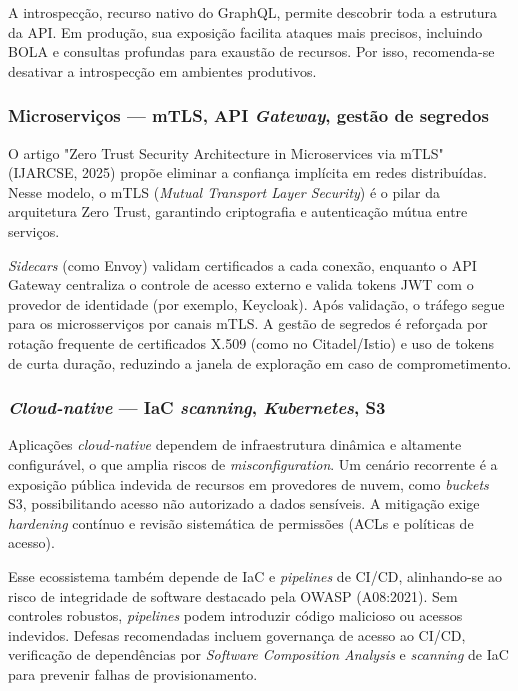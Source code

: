 A introspecção, recurso nativo do GraphQL, permite descobrir toda a estrutura da API. Em produção, sua exposição facilita ataques mais precisos, incluindo BOLA e consultas profundas para exaustão de recursos. Por isso, recomenda-se desativar a introspecção em ambientes produtivos.

\subsubsection{
    Microserviços — mTLS, API \textit{Gateway}, gestão de segredos
}\label{sec:microservicos}

O artigo "Zero Trust Security Architecture in Microservices via mTLS" (IJARCSE, 2025) propõe eliminar a confiança implícita em redes distribuídas. Nesse modelo, o mTLS (\textit{Mutual Transport Layer Security}) é o pilar da arquitetura Zero Trust, garantindo criptografia e autenticação mútua entre serviços.

\textit{Sidecars} (como Envoy) validam certificados a cada conexão, enquanto o API Gateway centraliza o controle de acesso externo e valida tokens JWT com o provedor de identidade (por exemplo, Keycloak). Após validação, o tráfego segue para os microsserviços por canais mTLS. A gestão de segredos é reforçada por rotação frequente de certificados X.509 (como no Citadel/Istio) e uso de tokens de curta duração, reduzindo a janela de exploração em caso de comprometimento.

\subsubsection{
    \textit{Cloud-native} — IaC \textit{scanning}, \textit{Kubernetes}, S3
}\label{sec:cloud_native}

Aplicações \textit{cloud-native} dependem de infraestrutura dinâmica e altamente configurável, o que amplia riscos de \textit{misconfiguration}. Um cenário recorrente é a exposição pública indevida de recursos em provedores de nuvem, como \textit{buckets} S3, possibilitando acesso não autorizado a dados sensíveis. A mitigação exige \textit{hardening} contínuo e revisão sistemática de permissões (ACLs e políticas de acesso).

Esse ecossistema também depende de IaC e \textit{pipelines} de CI/CD, alinhando-se ao risco de integridade de software destacado pela OWASP (A08:2021). Sem controles robustos, \textit{pipelines} podem introduzir código malicioso ou acessos indevidos. Defesas recomendadas incluem governança de acesso ao CI/CD, verificação de dependências por \textit{Software Composition Analysis} e \textit{scanning} de IaC para prevenir falhas de provisionamento.
